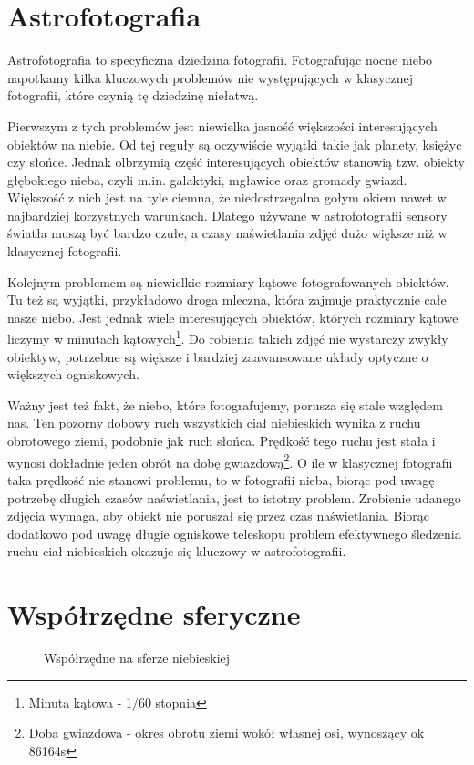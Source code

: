 \section{Astrofotografia}

Astrofotografia to specyficzna dziedzina fotografii. Fotografując nocne niebo
napotkamy kilka kluczowych problemów nie występujących w klasycznej fotografii,
które czynią tę dziedzinę niełatwą.

Pierwszym z tych problemów jest niewielka jasność większości interesujących
obiektów na niebie. Od tej reguły są oczywiście wyjątki takie jak planety,
księżyc czy słońce. Jednak olbrzymią część interesujących obiektów stanowią tzw.
obiekty głębokiego nieba, czyli m.in. galaktyki, mgławice oraz gromady gwiazd.
Większość z nich jest na tyle ciemna, że niedostrzegalna gołym okiem nawet
w najbardziej korzystnych warunkach. Dlatego używane w astrofotografii sensory
światła muszą być bardzo czułe, a czasy naświetlania zdjęć dużo większe niż
w klasycznej fotografii.

Kolejnym problemem są niewielkie rozmiary kątowe fotografowanych obiektów. Tu
też są wyjątki, przykładowo droga mleczna, która zajmuje praktycznie całe nasze
niebo. Jest jednak wiele interesujących obiektów, których rozmiary kątowe
liczymy w minutach kątowych\footnote{Minuta kątowa - 1/60 stopnia}. Do robienia
takich zdjęć nie wystarczy zwykły obiektyw, potrzebne są większe i bardziej
zaawansowane układy optyczne o większych ogniskowych.

Ważny jest też fakt, że niebo, które fotografujemy, porusza się stale względem
nas. Ten pozorny dobowy ruch wszystkich ciał niebieskich wynika z ruchu
obrotowego ziemi, podobnie jak ruch słońca. Prędkość tego ruchu jest stała
i wynosi dokładnie jeden obrót na dobę gwiazdową\footnote{Doba gwiazdowa - okres
obrotu ziemi wokół własnej osi, wynoszący ok 86164s}.  O ile w klasycznej
fotografii taka prędkość nie stanowi problemu, to w fotografii nieba, biorąc pod
uwagę potrzebę długich czasów naświetlania, jest to istotny problem. Zrobienie
udanego zdjęcia wymaga, aby obiekt nie poruszał się przez czas naświetlania.
Biorąc dodatkowo pod uwagę długie ogniskowe teleskopu problem efektywnego
śledzenia ruchu ciał niebieskich okazuje się kluczowy w astrofotografii.

\section{Współrzędne sferyczne}

\begin{figure}
\label{fig_sfera}

\caption{Współrzędne na sferze niebieskiej}
\end{figure}

